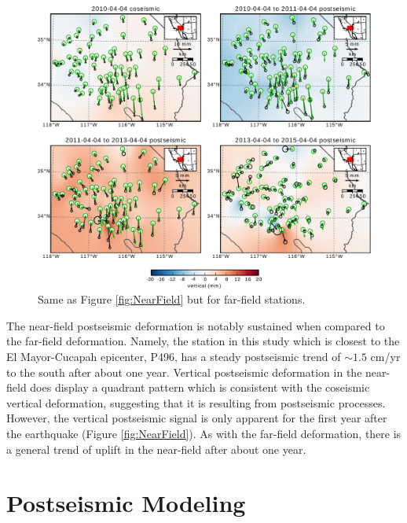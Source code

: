 \documentclass[draft,linenumbers]{AGUJournal}
\begin{document}
\begin{figure}
\includegraphics[scale=0.8]{Figures/MapViewFarField}
\centering 
\caption{Same as Figure \ref{fig:NearField} but for far-field stations.}
\label{fig:FarField}
\end{figure}

The near-field postseismic deformation is notably sustained when compared to the far-field deformation.  Namely, the station in this study which is closest to the El Mayor-Cucapah epicenter, P496, has a steady postseismic trend of ${\sim}1.5$ cm/yr to the south after about one year.  Vertical postseismic deformation in the near-field does display a quadrant pattern which is consistent with the coseismic vertical deformation, suggesting that it is resulting from postseismic processes.  However, the vertical postseismic signal is only apparent for the first year after the earthquake (Figure \ref{fig:NearField}).  As with the far-field deformation, there is a general trend of uplift in the near-field after about one year. 

\section{Postseismic Modeling}\label{sec:Model}
\end{document}
